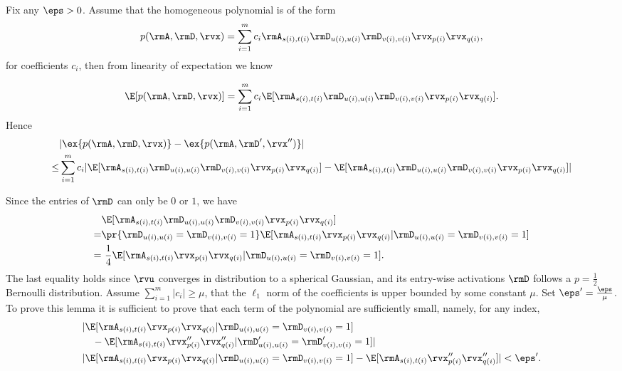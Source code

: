 \begin{proofof}{}
Fix any $\eps>0$.
Assume that the homogeneous polynomial is of the form
\begin{equation}
p(\rmA,\rmD,\rvx)=\sum_{i=1}^m c_i\rmA_{s(i),t(i)}\rmD_{u(i),u(i)}\rmD_{v(i),v(i)}\rvx_{p(i)}\rvx_{q(i)},
\end{equation}
for coefficients $c_i$, then from linearity of expectation we know
    
\begin{equation}
    \E[p(\rmA,\rmD,\rvx)] = \sum_{i=1}^m c_i\E[\rmA_{s(i),t(i)}\rmD_{u(i),u(i)}\rmD_{v(i),v(i)}\rvx_{p(i)}\rvx_{q(i)}].
\end{equation}
Hence \begin{equation}
\begin{split}
&|\ex{p(\rmA, \rmD, \rvx)} - \ex{p(\rmA, \rmD', \rvx'')}|\\
\leq&\sum_{i=1}^m c_i |\E[\rmA_{s(i),t(i)}\rmD_{u(i),u(i)}\rmD_{v(i),v(i)}\rvx_{p(i)}\rvx_{q(i)}] - \E[\rmA_{s(i),t(i)}\rmD_{u(i),u(i)}\rmD_{v(i),v(i)}\rvx_{p(i)}\rvx_{q(i)}]|
\end{split}
\end{equation}

Since the entries of $\rmD$ can only be $0$ or $1$, we have
\begin{equation}
\begin{split}
&\E[\rmA_{s(i),t(i)}\rmD_{u(i),u(i)}\rmD_{v(i),v(i)}\rvx_{p(i)}\rvx_{q(i)}]\\
=& \pr{\rmD_{u(i),u(i)}=\rmD_{v(i),v(i)}=1} \E[\rmA_{s(i),t(i)}\rvx_{p(i)}\rvx_{q(i)}|\rmD_{u(i),u(i)}=\rmD_{v(i),v(i)}=1]\\
=&\ \frac14\E[\rmA_{s(i),t(i)}\rvx_{p(i)}\rvx_{q(i)}|\rmD_{u(i),u(i)}=\rmD_{v(i),v(i)}=1].
\end{split}
\end{equation}
The last equality holds since $\rvu$ converges in distribution to a spherical Gaussian, and its entry-wise activations $\rmD$ follows a $p=\frac12$ Bernoulli distribution.
Assume $\sum_{i=1}^m|c_i|\geq \mu$, that the $\ell_1$ norm of the coefficients is upper bounded by some constant $\mu$. Set $\eps'=\frac{\eps}{\mu}$. To prove this lemma it is sufficient to prove that each term of the polynomial are sufficiently small, namely, for any index,
\begin{equation}
\begin{split}
&|\E[\rmA_{s(i),t(i)}\rvx_{p(i)}\rvx_{q(i)}|\rmD_{u(i),u(i)}=\rmD_{v(i),v(i)}=1]\\&\quad-\E[\rmA_{s(i),t(i)}\rvx''_{p(i)}\rvx''_{q(i)}|\rmD'_{u(i),u(i)}=\rmD'_{v(i),v(i)}=1]| 
\\
&|\E[\rmA_{s(i),t(i)}\rvx_{p(i)}\rvx_{q(i)}|\rmD_{u(i),u(i)}=\rmD_{v(i),v(i)}=1]-\E[\rmA_{s(i),t(i)}\rvx''_{p(i)}\rvx''_{q(i)}]|<\eps'.
\end{split}
\end{equation}


\end{proofof}
